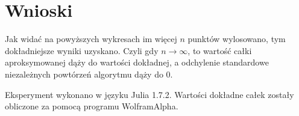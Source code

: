 \documentclass{article}
\begin{document}
\section{Wnioski}
Jak widać na powyższych wykresach im więcej $n$ punktów wylosowano, tym dokładniejsze wyniki uzyskano. Czyli gdy $n\rightarrow \infty$, to wartość całki aproksymowanej dąży do wartości dokładnej, a odchylenie standardowe niezależnych powtórzeń algorytmu dąży do 0.

Eksperyment wykonano w języku Julia 1.7.2.
Wartości dokładne całek zostały obliczone za pomocą programu WolframAlpha.
\end{document}
